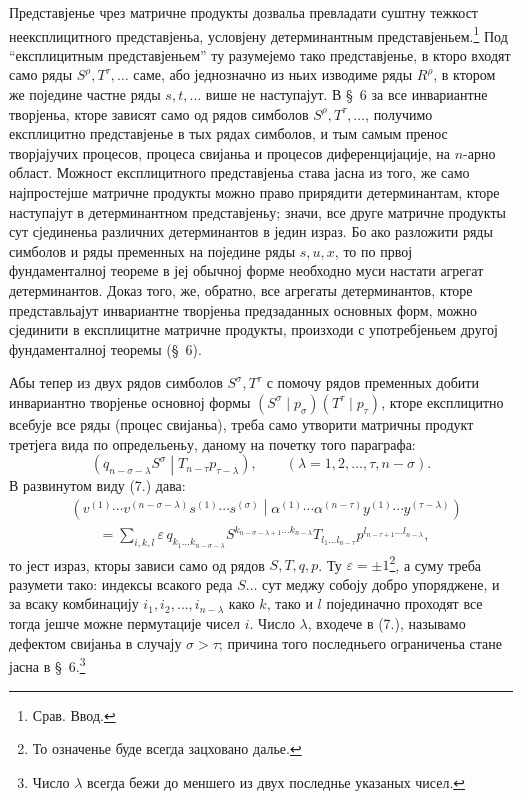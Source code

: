 ﻿\documentclass[11pt]{article}
\newcommand{\pair}[2]{\left(#1\middle|#2\right)}
\newcommand{\eps}{\varepsilon}
\begin{document}
Представјенье чрез матричне продукты дозвальа превладати суштну тежкост неексплицитного представјеньа, условјену детерминантным представјеньем.\footnote{Срав. Ввод.} Под ``експлицитным представјеньем'' ту разумејемо тако представјенье, в кторо входят само ряды $S^\rho,T^\tau,\ldots$ саме, або једнозначно из ньих изводиме ряды $R^\rho$, в ктором же поједине частне ряды $s,t,\ldots$ више не наступајут. В \S\ 6 за все инвариантне творјеньа, кторе зависят само од рядов симболов $S^\rho,T^\tau,\ldots$, получимо експлицитно представјенье в тых рядах симболов, и тым самым пренос творјајучих процесов, процеса свијаньа и процесов диференцијације, на $n$-арно област. Можност експлицитного представјеньа става јасна из того, же само најпростејше матричне продукты можно право прирядити детерминантам, кторе наступајут в детерминантном представјеньу; значи, все друге матричне продукты сут сјединеньа различних детерминантов в једин израз. Бо ако разложити ряды симболов и ряды пременных на поједине ряды $s,u,x$, то по првој фундаменталној теореме в јеј обычној форме необходно муси настати агрегат детерминантов. Доказ того, же, обратно, все агрегаты детерминантов, кторе представльајут инвариантне творјеньа предзаданных основных форм, можно сјединити в експлицитне матричне продукты, произходи с употребјеньем другој фундаменталној теоремы (\S\ 6).

Абы тепер из двух рядов симболов $S^\sigma,T^\tau$ с помочу рядов пременных добити инвариантно творјенье основној формы $(S^\sigma\mid p_\sigma)(T^\tau\mid p_\tau)$, кторе експлицитно всебује все ряды (процес свијаньа), треба само утворити матричны продукт третјега вида по определьеньу, даному на почетку того параграфа:
\begin{equation}
 \pair{q_{n-\sigma-\lambda}S^\sigma}{T_{n-\tau}p_{\tau-\lambda}},
 \qquad (\lambda=1,2,\ldots,\tau,n-\sigma).
\tag{7}
\end{equation}
В развинутом виду (7.) дава:
\begin{equation}
\begin{aligned}
&\pair{v^{(1)}\cdots v^{(n-\sigma-\lambda)}s^{(1)}\cdots s^{(\sigma)}}
       {\alpha^{(1)}\cdots\alpha^{(n-\tau)}y^{(1)}\cdots y^{(\tau-\lambda)}} \\
&\qquad =\sum_{i,k,l}\eps\,q_{k_1\ldots k_{n-\sigma-\lambda}}
 S^{k_{n-\sigma-\lambda+1}\ldots k_{n-\lambda}}
 T_{l_1\ldots l_{n-\tau}}
 p^{l_{n-\tau+1}\ldots l_{n-\lambda}},
\end{aligned}
\tag{8}
\end{equation}
то јест израз, кторы зависи само од рядов $S,T,q,p$. Ту $\eps=\pm1$\footnote{То означенье буде всегда зацховано далье.}, а суму треба разумети тако: индексы всакого реда $S\ldots$ сут меджу собоју добро упоряджене, и за всаку комбинацију $i_1,i_2,\ldots,i_{n-\lambda}$ како $k$, тако и $l$ појединачно проходят все тогда јешче можне пермутације чисел $i$. Число $\lambda$, входече в (7.), называмо дефектом свијаньа в случају $\sigma>\tau$; причина того последньего ограниченьа стане јасна в \S\ 6.\footnote{Число $\lambda$ всегда бежи до меншего из двух последнье указаных чисел.}
\end{document}
